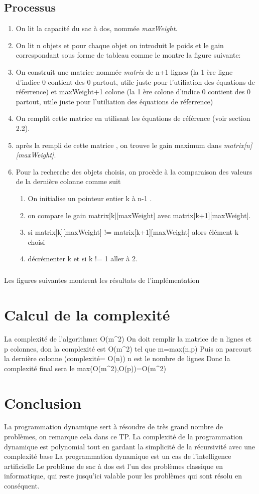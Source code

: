 \documentclass[12pt]{report}
\begin{document}
	\section{Processus}\begin{enumerate}
		\item On lit la capacité du sac à dos, nommée \emph{maxWeight}.
		\item On lit n objets et pour chaque objet on introduit le poids et le gain correspondant sous forme de tableau comme le montre la figure suivante:
		\item On construit une matrice nommée \emph{matrix} de n+1 lignes (la 1 ère ligne d'indice 0 contient des 0 partout, utile juste pour l'utiliation des équations de réferrence) et maxWeight+1 colone (la 1 ère colone d'indice 0 contient des 0 partout, utile juste pour l'utiliation des équations de réferrence)
		\item On remplit cette matrice en utilisant les équations de référence (voir section 2.2).
		\item après la rempli de cette matrice , on trouve le gain maximum dans \emph{matrix[n][maxWeight]}.
		\item Pour la recherche des objets choisis, on procède à la comparaison des valeurs de la dernière colonne comme suit
		\begin{enumerate}
		\item On initialise un pointeur entier k à n-1 .
		\item on compare le gain matrix[k][maxWeight] avec matrix[k+1][maxWeight].
		\item si matrix[k][maxWeight] != matrix[k+1][maxWeight] alors élément k choisi
		\item décrémenter k et si k != 1 aller à 2.
		\end{enumerate}
	\end{enumerate}
	\paragraph{}
	Les figures suivantes montrent les résultats de l'implémentation
	\chapter{Calcul de la complexité}
	La complexité de l'algorithme: O(m^2)
	On doit remplir la matrice de n lignes et p colonnes, don la complexité est O(m^2) tel que m=max(n,p)
	Puis on parcourt la dernière colonne (complexité= O(n)) n est le nombre de lignes
	Donc la complexité final sera le max(O(m^2),O(p))=O(m^2)
	\chapter{Conclusion}
	La programmation dynamique sert à résoudre de très grand nombre de problèmes, on remarque cela dans ce TP.
	La complexité de la programmation dynamique est polynomial tout en gardant la simplicité de la récursivité avec une complexité base
	La programmation dynamique est un cas de l'intelligence artificielle 
	Le problème de sac à dos est l'un des problèmes classique en informatique, qui reste jusqu'ici valable pour les problèmes qui sont résolu en conséquent.
		
\end{document}
